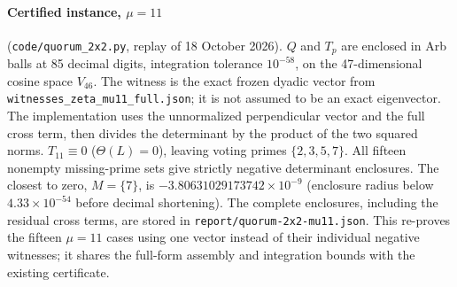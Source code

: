\documentclass[11pt]{article}
\begin{document}
\paragraph{Certified instance, $\mu=11$} (\texttt{code/quorum\_2x2.py}, replay of 18 October 2026). $Q$ and $T_p$ are enclosed in Arb balls at 85 decimal digits, integration tolerance $10^{-58}$, on the 47-dimensional cosine space $V_{46}$. The witness is the exact frozen dyadic vector from \texttt{witnesses\_zeta\_mu11\_full.json}; it is not assumed to be an exact eigenvector. The implementation uses the unnormalized perpendicular vector and the full cross term, then divides the determinant by the product of the two squared norms. $T_{11}\equiv0$ ($\Theta(L)=0$), leaving voting primes $\{2,3,5,7\}$. All fifteen nonempty missing-prime sets give strictly negative determinant enclosures. The closest to zero, $M=\{7\}$, is $-3.80631029173742\times10^{-9}$ (enclosure radius below $4.33\times10^{-54}$ before decimal shortening). The complete enclosures, including the residual cross terms, are stored in \texttt{report/quorum-2x2-mu11.json}. This re-proves the fifteen $\mu=11$ cases using one vector instead of their individual negative witnesses; it shares the full-form assembly and integration bounds with the existing certificate.
\end{document}
